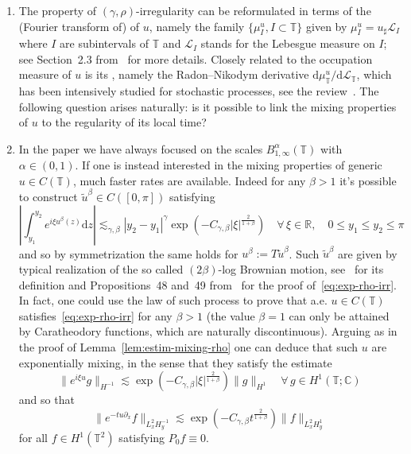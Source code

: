 \documentclass[11pt,oneside,reqno]{amsart}
\newcommand{\assign}{:=}
\newcommand{\mathd}{\mathrm{d}}
\newcommand{\tmtextit}[1]{\text{{\itshape{#1}}}}
\newenvironment{enumeratenumeric}{\begin{enumerate}[1.] }{\end{enumerate}}
\numberwithin{equation}{section}
\begin{document}
\begin{enumeratenumeric}
  \item The property of $(\gamma, \rho)$-irregularity can be reformulated in
  terms of the (Fourier transform of) \tmtextit{occupation measure} of $u$,
  namely the family $\{ \mu^u_I, I \subset \mathbb{T} \}$ given by $\mu^u_I =
  u_{\sharp} \mathcal{L}_I$ where $I$ are subintervals of $\mathbb{T}$ and
  $\mathcal{L}_I$ stands for the Lebesgue measure on $I$; see Section~2.3
  from~{\cite{galeati2020prevalence}} for more details. Closely related to the
  occupation measure of $u$ is its \tmtextit{local time}, namely the
  Radon--Nikodym derivative $\mathd \mu^u_{\mathbb{T}} / \mathd
  \mathcal{L}_{\mathbb{T}}$, which has been intensively studied for stochastic
  processes, see the review~{\cite{geman}}. The following question arises
  naturally: is it possible to link the mixing properties of $u$ to the
  regularity of its local time?
  
  \item In the paper we have always focused on the scales $B^{\alpha}_{1,
  \infty} (\mathbb{T})$ with $\alpha \in (0, 1)$. If one is instead interested
  in the mixing properties of generic $u \in C (\mathbb{T})$, much faster
  rates are available. Indeed for any $\beta > 1$ it's possible to construct
  $\tilde{u}^{\beta} \in C ([0, \pi])$ satisfying
  \begin{equation}
    \left| \int_{y_1}^{y_2} e^{i \xi u^{\beta} (z)} \mathd z \right|
    \lesssim_{\gamma, \beta} | y_2 - y_1 |^{\gamma} \exp \left( - C_{\gamma,
    \beta}  | \xi |^{\frac{2}{1 + \beta}} \right) \quad \forall \, \xi \in
    \mathbb{R}, \quad 0 \leqslant y_1 \leqslant y_2 \leqslant \pi
    \label{eq:exp-rho-irr}
  \end{equation}
  and so by symmetrization the same holds for $u^{\beta} \assign T
  \tilde{u}^{\beta}$. Such $\tilde{u}^{\beta}$ are given by typical
  realization of the so called $(2 \beta)$-log Brownian motion,
  see~{\cite{perkowski}} for its definition and Propositions~48 and~49
  from~{\cite{galeati2020prevalence}} for the proof of~\eqref{eq:exp-rho-irr}.
  In fact, one could use the law of such process to prove that a.e. $u \in C
  (\mathbb{T})$ satisfies~\eqref{eq:exp-rho-irr} for any $\beta > 1$ (the
  value $\beta = 1$ can only be attained by Caratheodory functions, which are
  naturally discontinuous). Arguing as in the proof of
  Lemma~\ref{lem:estim-mixing-rho} one can deduce that such $u$ are
  exponentially mixing, in the sense that they satisfy the estimate
  \begin{equation}
    \| e^{i \xi u} g \|_{H^{- 1}} \lesssim \exp \left( - C_{\gamma, \beta}  |
    \xi |^{\frac{2}{1 + \beta}} \right)  \| g \|_{H^1} \quad \forall \, g \in
    H^1 (\mathbb{T}; \mathbb{C})
  \end{equation}
  and so that
  \begin{equation}
    \| e^{- t u \partial_x} f \|_{L^2_x H^{- 1}_y} \lesssim \exp \left( -
    C_{\gamma, \beta} t^{\frac{2}{1 + \beta}} \right) \| f \|_{L^2_x H^1_y}
  \end{equation}
  for all $f \in H^1 (\mathbb{T}^2)$ satisfying $P_0 f \equiv 0$.
  

\end{enumeratenumeric}
\end{document}
